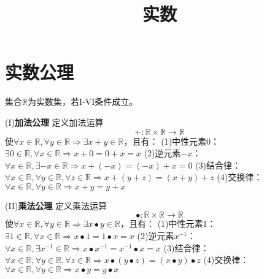 \documentclass[11pt]{article}
\title{实数}
\date{}
\begin{document}
  \maketitle

  \linenumbers
\section{实数公理}
集合$\mathbb{R}$为实数集，若I-VI条件成立。

\newline

(I)\textbf{加法公理}
\newline
定义加法运算
\begin{equation}
    +:\mathbb{R} \times \mathbb{R} \rightarrow \mathbb{R}
\end{equation}
使$\forall x \in \mathbb{R}, \forall y \in \mathbb{R} \Rightarrow \exists x+y \in \mathbb{R}$，且有：
\newline
(1)中性元素0：
\newline
$\exists 0 \in \mathbb{R}, \forall x \in \mathbb{R} \Rightarrow x+0=0+x=x$
\newline
(2)逆元素$-x$：
\newline
$\forall x \in \mathbb{R}, \exists -x \in \mathbb{R} \Rightarrow x+(-x)=(-x)+x=0$
\newline
(3)结合律：
\newline
$\forall x \in \mathbb{R}, \forall y \in \mathbb{R}, \forall z \in \mathbb{R} \Rightarrow x+(y+z)=(x+y)+z$
\newline
(4)交换律：
\newline
$\forall x \in \mathbb{R}, \forall y \in \mathbb{R} \Rightarrow x+y=y+x$
\newline

(II)\textbf{乘法公理}
\newline
定义乘法运算
\begin{equation}
    \bullet:\mathbb{R} \times \mathbb{R} \rightarrow \mathbb{R}
\end{equation}
使$\forall x \in \mathbb{R}, \forall y \in \mathbb{R} \Rightarrow \exists x \bullet y\in\mathbb{R}$，且有：
\newline
(1)中性元素1：
\newline
$\exists 1 \in \mathbb{R}, \forall x \in \mathbb{R} \Rightarrow x \bullet 1=1 \bullet x=x$
\newline
(2)逆元素$x^{-1}$：
\newline
$\forall x \in \mathbb{R}, \exists x^{-1} \in \mathbb{R} \Rightarrow x \bullet x^{-1}=x^{-1} \bullet x=x$
\newline
(3)结合律：
\newline
$\forall x \in \mathbb{R}, \forall y \in \mathbb{R}, \forall z \in \mathbb{R} \Rightarrow x \bullet (y \bullet z)=(x \bullet y) \bullet z$
\newline
(4)交换律：
\newline
$\forall x \in \mathbb{R}, \forall y \in \mathbb{R} \Rightarrow x\bullet y=y\bullet x$
\newline
\end{document}
